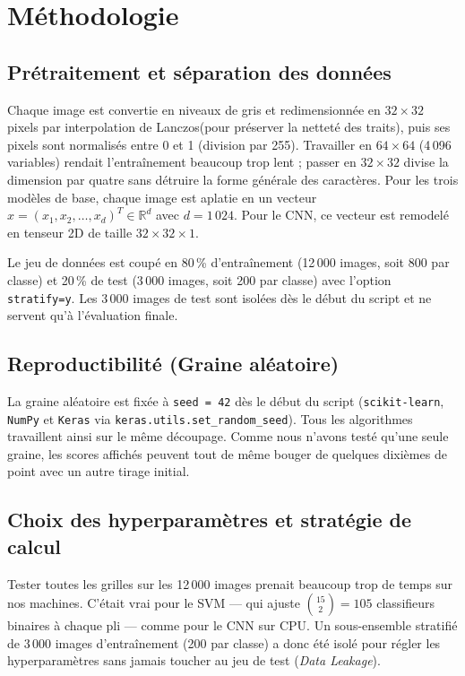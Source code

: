 \documentclass[10pt,a4paper]{article}
\begin{document}
\section{Méthodologie}\label{sec:meth}

\subsection{Prétraitement et séparation des données}
Chaque image est convertie en niveaux de gris et redimensionnée en $32\times32$ pixels par interpolation de Lanczos(pour préserver la netteté des traits), puis ses pixels sont normalisés entre 0 et 1 (division par 255). Travailler en $64\times64$ (4\,096 variables) rendait l'entraînement beaucoup trop lent ; passer en $32\times32$ divise la dimension par quatre sans détruire la forme générale des caractères. Pour les trois modèles de base, chaque image est aplatie en un vecteur $x = (x_1, x_2, \dots, x_d)^T \in \mathbb{R}^d$ avec $d = 1\,024$. Pour le CNN, ce vecteur est remodelé en tenseur 2D de taille $32\times32\times1$.

Le jeu de données est coupé en 80\,\% d'entraînement (12\,000 images, soit 800 par classe) et 20\,\% de test (3\,000 images, soit 200 par classe) avec l'option \texttt{stratify=y}. Les 3\,000 images de test sont isolées dès le début du script et ne servent qu'à l'évaluation finale.

\subsection{Reproductibilité (Graine aléatoire)}
La graine aléatoire est fixée à \texttt{seed = 42} dès le début du script (\texttt{scikit-learn}, \texttt{NumPy} et \texttt{Keras} via \texttt{keras.utils.set\_random\_seed}). Tous les algorithmes travaillent ainsi sur le même découpage. Comme nous n'avons testé qu'une seule graine, les scores affichés peuvent tout de même bouger de quelques dixièmes de point avec un autre tirage initial.

\subsection{Choix des hyperparamètres et stratégie de calcul}
Tester toutes les grilles sur les 12\,000 images prenait beaucoup trop de temps sur nos machines. C'était vrai pour le SVM — qui ajuste $\binom{15}{2} = 105$ classifieurs binaires à chaque pli — comme pour le CNN sur CPU. Un sous-ensemble stratifié de 3\,000 images d'entraînement (200 par classe) a donc été isolé pour régler les hyperparamètres sans jamais toucher au jeu de test (\emph{Data Leakage}).
\end{document}
